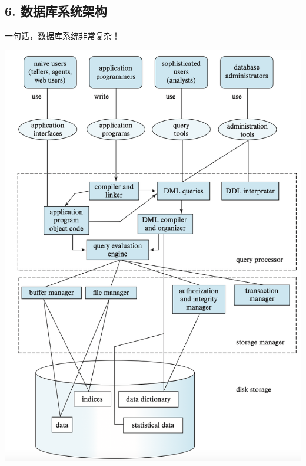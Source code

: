 \documentclass[aspectratio=169, 14pt]{beamer}
\begin{document}
\begin{frame}
    \section{\textcolor{darkmidnightblue}{6. 数据库系统架构}}  
    一句话，数据库系统非常复杂！
\end{frame}

\begin{frame}
    \begin{center}
        \includegraphics[height=.95\paperheight]{DBMS}
    \end{center}

    

\end{frame}
\end{document}
